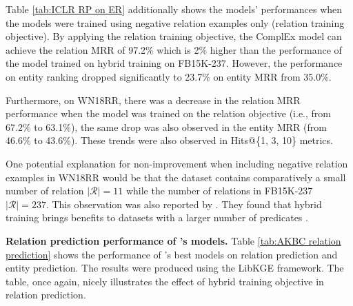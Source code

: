 Table \ref{tab:ICLR RP on ER} additionally shows the models' performances when the models were trained using negative relation examples only (relation training objective). By applying the relation training objective, the ComplEx model can achieve the relation MRR of 97.2\% which is 2\% higher than the performance of the model trained on hybrid training on FB15K-237. However, the performance on entity ranking dropped significantly to 23.7\% on entity MRR from 35.0\%. 

Furthermore, on WN18RR, there was a decrease in the relation MRR performance when the model was trained on the relation objective (i.e., from 67.2\% to 63.1\%), the same drop was also observed in the entity MRR (from 46.6\% to 43.6\%). These trends were also observed in Hits@\{1, 3, 10\} metrics.


One potential explanation for non-improvement when including negative relation examples in WN18RR would be that the dataset contains comparatively a small number of relation $|\mathcal{R}| = 11$ while the number of relations in FB15K-237 $|\mathcal{R}| = 237$. This observation was also reported by \cite{chen2021relation}. They found that hybrid training brings benefits to datasets with a larger number of predicates \citep{chen2021relation}.
\newline
 
 
\noindent\textbf{Relation prediction performance of \cite{chen2021relation}'s models.} Table \ref{tab:AKBC relation prediction} shows the performance of \citet{chen2021relation}'s best models on relation prediction and entity prediction. The results were produced using the LibKGE framework. The table, once again, nicely illustrates the effect of hybrid training objective in relation prediction. 


